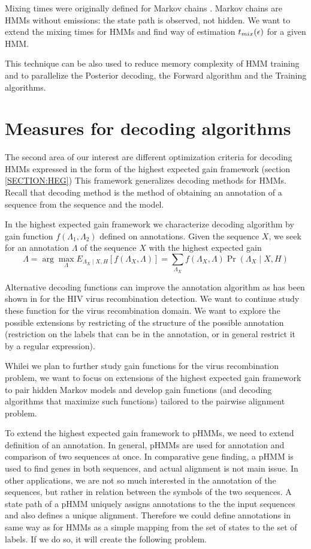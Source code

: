 Mixing times were originally defined for Markov chains \cite{Levin2006}. Markov
chains are HMMs without emissions: the state path is observed, not hidden. We
want to extend the mixing times for HMMs and find way of estimation $t_{mix}(\epsilon)$ for
a given HMM.

This technique can be also used to reduce memory complexity of HMM training and
to parallelize the Posterior decoding, the Forward algorithm and the
Training algorithms.

\section{Measures for decoding algorithms}

The second area of our interest are different optimization criteria for decoding
HMMs expressed in the form of the highest expected gain framework (section
\ref{SECTION:HEG}) This framework generalizes decoding methods for HMMs. Recall
that decoding method is the method of obtaining an annotation of a sequence from
the sequence and the model. 

In the highest expected gain framework we characterize decoding algorithm by
gain function $f(\Lambda_1,\Lambda_2)$ defined on annotations. Given the
sequence $X$, we seek for an annotation $\Lambda$ of the sequence $X$ with the
highest expected gain \[\Lambda = \arg\max_{\Lambda} E_{\Lambda_X\mid
X,H}[f(\Lambda_X,\Lambda)] =
\sum_{\Lambda_X}f(\Lambda_X,\Lambda)\Pr\left(\Lambda_X\mid X,H\right) \]


Alternative
decoding functions can improve the annotation algorithm as has been shown in
\cite{Nanasi2010,Truszkowski2011} for the HIV virus recombination detection.
We want to continue study these function for the virus recombination domain. We
want to explore the  possible extensions by restricting of the structure of the
possible annotation (restriction on the labels that can be in the annotation, or
in general restrict it by a regular expression).

Whilei we plan to further study gain functions for the virus recombination
problem, we want to focus on extensions of the highest expected gain framework to
pair hidden Markov models and develop gain functions (and decoding algorithms
that maximize such functions) tailored to the pairwise alignment problem. 

To extend the highest expected gain framework to pHMMs, we need to extend
definition of an annotation. In general, pHMMs are used for annotation and
comparison of two sequences at once. In comparative gene finding, a pHMM is used
to find genes in both sequences, and actual alignment is not main issue. In
other applications, we are not so much interested in the annotation of the
sequences, but rather in relation between the symbols of the two sequences. A
state path of a pHMM uniquely assigns annotations to the the input sequences and
also defines a unique alignment.  Therefore we could define annotations in same
way as for HMMs as a simple mapping from the set of states to the set of labels.
If we do so, it will create the following problem.

